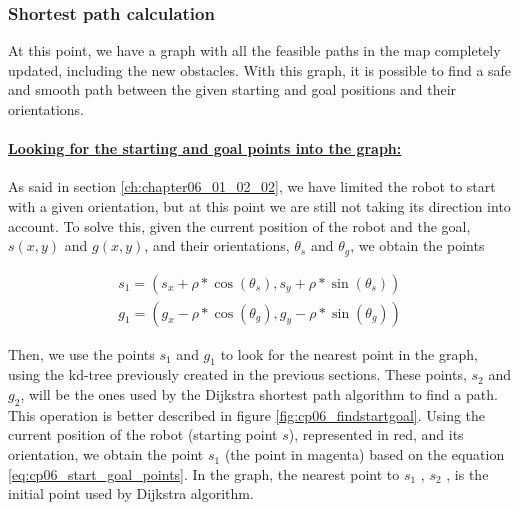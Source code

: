 \subsubsection{Shortest path calculation}\label{ch:chapter06_01_02_04}

At this point, we have a graph with all the feasible paths in the map completely updated, including the new obstacles. With this graph, it is possible to find a safe and smooth path between the given starting and goal positions and their orientations.

\paragraph{\underline{Looking for the starting and goal points into the graph:}}\label{ch:chapter06_01_02_04_01}

As said in section \ref{ch:chapter06_01_02_02}, we have limited the robot to start with a given orientation, but at this point we are still not taking its direction into account. To solve this, given the current position of the robot and the goal, $s(x,y)$ and $g(x,y)$, and their orientations, $\theta_s$ and $\theta_g$, we obtain the points

\begin{equation}\label{eq:cp06_start_goal_points}
\begin {array}{l}
 s_1 = (s_x + \rho * \cos(\theta_s), s_y + \rho * \sin(\theta_s)) \\
 g_1 = (g_x - \rho * \cos(\theta_g), g_y - \rho * \sin(\theta_g))
\end{array}
\end{equation}

Then, we use the points $s_1$ and $g_1$ to look for the nearest point in the graph, using the kd-tree previously created in the previous sections. These points, $s_2$ and $g_2$, will be the ones used by the Dijkstra shortest path algorithm to find a path. This operation is better described in figure \ref{fig:cp06_findstartgoal}. Using the current position of the robot (starting point $s$), represented in red, and its orientation, we obtain the point $s_1$ (the point in magenta) based on the equation \ref{eq:cp06_start_goal_points}. In the graph, the nearest point to $s_1$ , $s_2$ , is the initial point used by Dijkstra algorithm.

